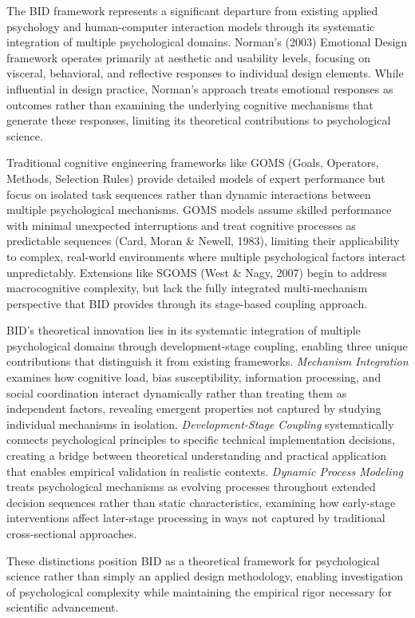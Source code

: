 \documentclass[
  authoryear,
  preprint]{elsarticle}
\begin{document}
The BID framework represents a significant departure from existing
applied psychology and human-computer interaction models through its
systematic integration of multiple psychological domains. Norman's
(2003) Emotional Design framework operates primarily at aesthetic and
usability levels, focusing on visceral, behavioral, and reflective
responses to individual design elements. While influential in design
practice, Norman's approach treats emotional responses as outcomes
rather than examining the underlying cognitive mechanisms that generate
these responses, limiting its theoretical contributions to psychological
science.

Traditional cognitive engineering frameworks like GOMS (Goals,
Operators, Methods, Selection Rules) provide detailed models of expert
performance but focus on isolated task sequences rather than dynamic
interactions between multiple psychological mechanisms. GOMS models
assume skilled performance with minimal unexpected interruptions and
treat cognitive processes as predictable sequences (Card, Moran \&
Newell, 1983), limiting their applicability to complex, real-world
environments where multiple psychological factors interact
unpredictably. Extensions like SGOMS (West \& Nagy, 2007) begin to
address macrocognitive complexity, but lack the fully integrated
multi-mechanism perspective that BID provides through its stage-based
coupling approach.

BID's theoretical innovation lies in its systematic integration of
multiple psychological domains through development-stage coupling,
enabling three unique contributions that distinguish it from existing
frameworks. \emph{Mechanism Integration} examines how cognitive load,
bias susceptibility, information processing, and social coordination
interact dynamically rather than treating them as independent factors,
revealing emergent properties not captured by studying individual
mechanisms in isolation. \emph{Development-Stage Coupling}
systematically connects psychological principles to specific technical
implementation decisions, creating a bridge between theoretical
understanding and practical application that enables empirical
validation in realistic contexts. \emph{Dynamic Process Modeling} treats
psychological mechanisms as evolving processes throughout extended
decision sequences rather than static characteristics, examining how
early-stage interventions affect later-stage processing in ways not
captured by traditional cross-sectional approaches.

These distinctions position BID as a theoretical framework for
psychological science rather than simply an applied design methodology,
enabling investigation of psychological complexity while maintaining the
empirical rigor necessary for scientific advancement.
\end{document}
